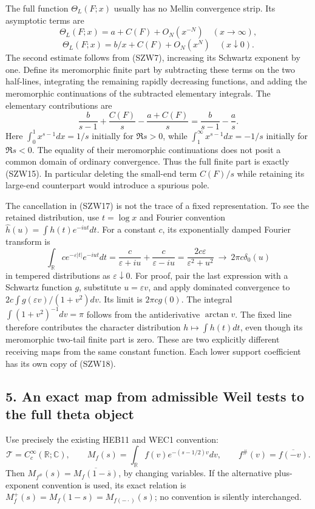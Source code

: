 \documentclass[
  10pt,
  a4paper,
]{article}
\begin{document}
The full function \(\Theta_L(F;x)\) usually has no Mellin convergence
strip. Its asymptotic terms are \[
\Theta_L(F;x)=a+C(F)+O_N(x^{-N})\quad(x\to\infty),
\] \[
\Theta_L(F;x)=b/x+C(F)+O_N(x^N)\quad(x\downarrow0).
\tag{SZW16}
\] The second estimate follows from (SZW7), increasing its Schwartz
exponent by one. Define its meromorphic finite part by subtracting these
terms on the two half-lines, integrating the remaining rapidly
decreasing functions, and adding the meromorphic continuations of the
subtracted elementary integrals. The elementary contributions are \[
\frac{b}{s-1}+\frac{C(F)}s-\frac{a+C(F)}s
=\frac{b}{s-1}-\frac as.
\tag{SZW17}
\] Here \(\int_0^1x^{s-1}dx=1/s\) initially for \(\Re s>0\), while
\(\int_1^\infty x^{s-1}dx=-1/s\) initially for \(\Re s<0\). The equality
of their meromorphic continuations does not posit a common domain of
ordinary convergence. Thus the full finite part is exactly (SZW15). In
particular deleting the small-end term \(C(F)/s\) while retaining its
large-end counterpart would introduce a spurious pole.

The cancellation in (SZW17) is not the trace of a fixed representation.
To see the retained distribution, use \(t=\log x\) and Fourier
convention \(\widehat h(u)=\int h(t)e^{-iut}dt\). For a constant \(c\),
its exponentially damped Fourier transform is \[
\int_{\mathbb R}c e^{-\varepsilon|t|}e^{-iut}dt
=\frac{c}{\varepsilon+iu}+\frac{c}{\varepsilon-iu}
=\frac{2c\varepsilon}{\varepsilon^2+u^2}
\ \longrightarrow\ 2\pi c\delta_0(u)
\tag{SZW18}
\] in tempered distributions as \(\varepsilon\downarrow0\). For proof,
pair the last expression with a Schwartz function \(g\), substitute
\(u=\varepsilon v\), and apply dominated convergence to
\(2c\int g(\varepsilon v)/(1+v^2)dv\). Its limit is \(2\pi c g(0)\). The
integral \(\int(1+v^2)^{-1}dv=\pi\) follows from the antiderivative
\(\arctan v\). The fixed line therefore contributes the character
distribution \(h\mapsto\int h(t)dt\), even though its meromorphic
two-tail finite part is zero. These are two explicitly different
receiving maps from the same constant function. Each lower support
coefficient has its own copy of (SZW18).

\subsection{5. An exact map from admissible Weil tests to the full theta
object}\label{an-exact-map-from-admissible-weil-tests-to-the-full-theta-object}

Use precisely the existing HEB11 and WEC1 convention: \[
\mathcal T=C_c^\infty(\mathbb R;\mathbb C),\qquad
M_f(s)=\int_{\mathbb R}f(v)e^{-(s-1/2)v}dv,
\qquad f^\#(v)=\overline{f(-v)}.
\tag{SZW19}
\] Then \(M_{f^\#}(s)=\overline{M_f(1-\overline s)}\), by changing
variables. If the alternative plus-exponent convention is used, its
exact relation is \(M_f^+(s)=M_f(1-s)=M_{f(-\cdot)}(s)\); no convention
is silently interchanged.
\end{document}
